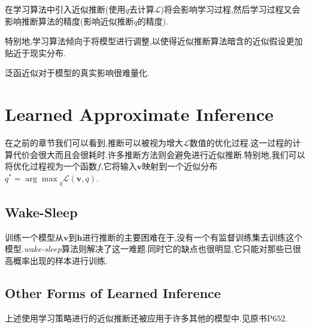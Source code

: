 在学习算法中引入近似推断(使用$q$去计算$\mathcal L$)将会影响学习过程,然后学习过程又会影响推断算法的精度(影响近似推断$q$的精度).

特别地,学习算法倾向于将模型进行调整,以使得近似推断算法暗含的近似假设更加贴近于现实分布.

泛函近似对于模型的真实影响很难量化.

\section{Learned Approximate Inference}

在之前的章节我们可以看到,推断可以被视为增大$\mathcal L$数值的优化过程.这一过程的计算代价会很大而且会很耗时.许多推断方法则会避免进行近似推断.特别地,我们可以将优化过程视为一个函数$f$,它将输入$\bm v$映射到一个近似分布$q^\ast={\arg\max}_q\mathcal L(\bm v,q)$.

\subsection{Wake-Sleep}

训练一个模型从$\bm v$到$\bm h$进行推断的主要困难在于,没有一个有监督训练集去训练这个模型.\textit{wake-sleep}算法则解决了这一难题.同时它的缺点也很明显,它只能对那些已很高概率出现的样本进行训练.

\subsection{Other Forms of Learned Inference}

上述使用学习策略进行的近似推断还被应用于许多其他的模型中.见原书P$652$.